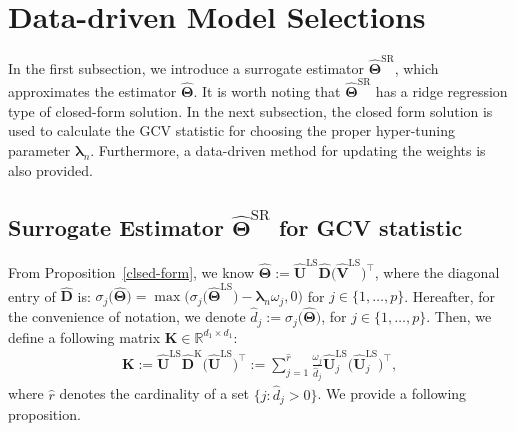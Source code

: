 \documentclass[alpha-refs]{wiley-article}
\begin{document}
\section{Data-driven Model Selections} \label{parameter_selection}
In the first subsection, we introduce a surrogate estimator $\widehat{\boldsymbol{\Theta}}^{\text{SR}}$, which approximates the estimator $\widehat{\boldsymbol{\Theta}}$.
It is worth noting that $\widehat{\boldsymbol{\Theta}}^{\text{SR}}$ has a ridge regression type of closed-form solution.
In the next subsection, the closed form solution is used to calculate the GCV statistic for choosing the proper hyper-tuning parameter  $\boldsymbol{\lambda}_{n}$.
Furthermore, a data-driven method for updating the weights is also provided.

\subsection{Surrogate Estimator $\widehat{\boldsymbol{\Theta}}^{\text{SR}}$ for GCV statistic}
From Proposition~\ref{clsed-form}, we know $\widehat{\boldsymbol{\Theta}} := \widehat{\boldsymbol{U}}^{\text{LS}}\widehat{\boldsymbol{D}}\big(\widehat{\boldsymbol{V}}^{\text{LS}}\big)^{\top}$,
where the diagonal entry of $\widehat{\boldsymbol{D}}$ is: $\sigma_{j}\big(\widehat{\boldsymbol{\Theta}}\big) = \max \big(  \sigma_{j}\big(\widehat{\boldsymbol{\Theta}}^{\text{LS}}\big)-\boldsymbol{\lambda}_{n} \omega_{j},0 \big)$ for $j\in\{1,\dots,p\}$.
Hereafter, for the convenience of notation, we denote $\widehat{d}_{j}:=\sigma_{j}\big(\widehat{\boldsymbol{\Theta}}\big)$, for $j\in\{1,\dots,p\}$.
Then, we define a following matrix $\boldsymbol{K}\in\mathbb{R}^{d_{1}\times d_{1}}$:
\begin{align} \label{K}
    \boldsymbol{K}
    :=  \widehat{\boldsymbol{U}}^{\text{LS}} \widehat{\boldsymbol{D}}^{\text{K}} \big(\widehat{\boldsymbol{U}}^{\text{LS}} \big)^{\top}
    :=\sum_{j=1}^{\widehat{r}}
    \frac{\omega_{j}}{\widehat{d}_{j}}
    \widehat{\boldsymbol{U}}_{j}^{\text{LS}} \big(\widehat{\boldsymbol{U}}_{j}^{\text{LS}}\big)^{\top},
\end{align}
where $\widehat{r}$ denotes the cardinality of a set $\{j : \widehat{d}_{j}>0 \}$.
We provide a following proposition.
\end{document}
